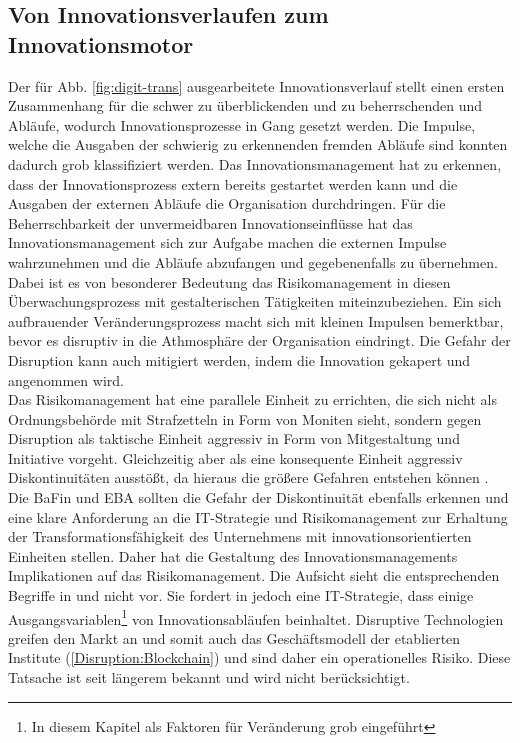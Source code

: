 \subsection{Von Innovationsverlaufen zum Innovationsmotor}
Der für Abb. \ref{fig:digit-trans} ausgearbeitete Innovationsverlauf stellt einen ersten Zusammenhang für die schwer zu überblickenden und zu beherrschenden und Abläufe, wodurch Innovationsprozesse in Gang gesetzt werden. Die Impulse, welche die Ausgaben der schwierig zu erkennenden fremden Abläufe sind konnten dadurch grob klassifiziert werden. Das Innovationsmanagement hat zu erkennen, dass der Innovationsprozess extern bereits gestartet werden kann und die Ausgaben der externen Abläufe die Organisation durchdringen. Für die Beherrschbarkeit der unvermeidbaren Innovationseinflüsse hat das Innovationsmanagement sich zur Aufgabe machen die externen Impulse wahrzunehmen und die Abläufe abzufangen und gegebenenfalls zu übernehmen.
Dabei ist es von besonderer Bedeutung das Risikomanagement in diesen Überwachungsprozess mit gestalterischen Tätigkeiten miteinzubeziehen. Ein sich aufbrauender Veränderungsprozess macht sich mit kleinen Impulsen bemerktbar, bevor es disruptiv in die Athmosphäre der Organisation eindringt. Die Gefahr der Disruption kann auch mitigiert werden, indem die Innovation gekapert und angenommen wird.
\medskip
\\
Das Risikomanagement hat eine parallele Einheit zu errichten, die sich nicht als Ordnungsbehörde mit Strafzetteln in Form von Moniten sieht, sondern gegen Disruption als taktische Einheit aggressiv in Form von Mitgestaltung und Initiative vorgeht. Gleichzeitig aber als eine konsequente Einheit aggressiv Diskontinuitäten ausstößt, da hieraus die größere Gefahren entstehen können \cite{Fernandez:2020}.
\medskip
\\
Die \ac{BaFin} und \ac{EBA} sollten die Gefahr der Diskontinuität ebenfalls erkennen und eine klare Anforderung an die IT-Strategie und Risikomanagement zur Erhaltung der Transformationsfähigkeit des Unternehmens mit innovationsorientierten Einheiten stellen.
Daher hat die Gestaltung des Innovationsmanagements Implikationen auf das Risikomanagement. Die Aufsicht sieht die entsprechenden Begriffe in \cite{MaRisk:2017} und \cite{BAIT:2018} nicht vor. Sie fordert in \cite{BAIT:2018} jedoch eine IT-Strategie, dass einige Ausgangsvariablen\footnote{In diesem Kapitel als Faktoren für Veränderung grob eingeführt} von Innovationsabläufen beinhaltet. 
Disruptive Technologien greifen den Markt an \cite{Fernandez:2020} und somit auch das Geschäftsmodell der etablierten Institute (\ref{Disruption:Blockchain}) und sind daher ein operationelles Risiko. Diese Tatsache ist seit längerem bekannt \cite{Ganswindt2006} und wird nicht berücksichtigt.
\medskip
\\
